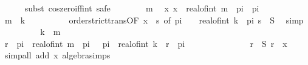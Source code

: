 \begin{isabellebody}
\ \ \ \ \isamarkupfalse%
\ {\isacharparenleft}{\kern0pt}subst\ cos{\isacharunderscore}{\kern0pt}zero{\isacharunderscore}{\kern0pt}iff{\isacharunderscore}{\kern0pt}int{}{\isacharcomma}{\kern0pt}\ safe{\isacharparenright}{\kern0pt}\isanewline
\ \ \ \ \ \ \isamarkupfalse%
\ m\ \isamarkupfalse%
\ x{\isacharcolon}{\kern0pt}\ {\isachardoublequoteopen}x\ {\isacharequal}{\kern0pt}\ real{\isacharunderscore}{\kern0pt}of{\isacharunderscore}{\kern0pt}int\ m\ {\isacharasterisk}{\kern0pt}\ pi\ {\isacharplus}{\kern0pt}\ pi\ {\isacharslash}{\kern0pt}\ {}{\isachardoublequoteclose}\isanewline
\ \ \ \ \ \ \isamarkupfalse%
\ \isamarkupfalse%
\ {\isachardoublequoteopen}m\ {\isacharless}{\kern0pt}\ k{\isachardoublequoteclose}\isanewline
\ \ \ \ \ \ \ \ \isamarkupfalse%
\ order{\isachardot}{\kern0pt}strict{\isacharunderscore}{\kern0pt}trans{}{\isacharbrackleft}{\kern0pt}OF\ {\isacartoucheopen}x\ {\isasymle}\ s{\isacartoucheclose}{\isacharcomma}{\kern0pt}\ of\ {\isachardoublequoteopen}pi\ {\isacharslash}{\kern0pt}\ {}\ {\isacharplus}{\kern0pt}\ real{\isacharunderscore}{\kern0pt}of{\isacharunderscore}{\kern0pt}int\ k\ {\isacharasterisk}{\kern0pt}\ pi{\isachardoublequoteclose}{\isacharbrackright}{\kern0pt}\ {\isacartoucheopen}s\ {\isasymin}\ {\isacharquery}{\kern0pt}S{\isacartoucheclose}\ \isamarkupfalse%
\ simp\isanewline
\ \ \ \ \ \ \isamarkupfalse%
\ \isamarkupfalse%
\ {\isachardoublequoteopen}k\ {\isasymle}\ m{\isachardoublequoteclose}\isanewline
\ \ \ \ \ \ \isamarkupfalse%
{\isacharminus}{\kern0pt}\isanewline
\ \ \ \ \ \ \ \ \isamarkupfalse%
\ {\isachardoublequoteopen}r\ {\isasymle}\ pi\ {\isacharasterisk}{\kern0pt}\ real{\isacharunderscore}{\kern0pt}of{\isacharunderscore}{\kern0pt}int\ m\ {\isacharplus}{\kern0pt}\ pi\ {\isacharslash}{\kern0pt}\ {}{\isachardoublequoteclose}\ {\isachardoublequoteopen}pi\ {\isacharasterisk}{\kern0pt}\ real{\isacharunderscore}{\kern0pt}of{\isacharunderscore}{\kern0pt}int\ k\ {\isacharless}{\kern0pt}\ r\ {\isacharplus}{\kern0pt}\ pi\ {\isacharslash}{\kern0pt}\ {}\ {\isachardoublequoteclose}\isanewline
\ \ \ \ \ \ \ \ \ \ \isamarkupfalse%
\ {\isacartoucheopen}r\ {\isasymin}\ {\isacharquery}{\kern0pt}S{\isacartoucheclose}\ {\isacartoucheopen}r\ {\isasymle}\ x{\isacartoucheclose}\ \isamarkupfalse%
\ {\isacharparenleft}{\kern0pt}simp{\isacharunderscore}{\kern0pt}all\ add{\isacharcolon}{\kern0pt}\ x\ algebra{\isacharunderscore}{\kern0pt}simps{\isacharparenright}{\kern0pt}\isanewline

\end{isabellebody}
